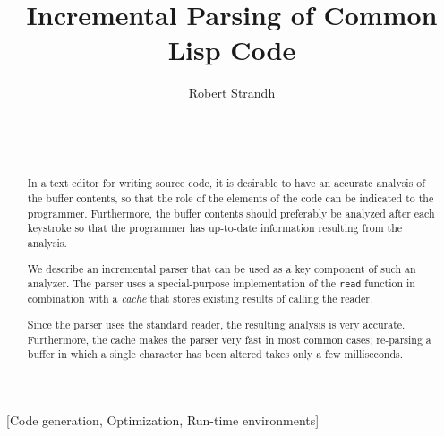 \documentclass{acm_proc_article-sp}
\def\inputtex#1{}
\begin{document}
\title{Incremental Parsing of Common Lisp Code}
\author{\alignauthor
Robert Strandh\\
\\
\\
\\
}


\maketitle

\begin{abstract}
In a text editor for writing \commonlisp{} \cite{ansi:common:lisp}
source code, it is desirable to have an accurate analysis of the
buffer contents, so that the role of the elements of the code can be
indicated to the programmer.  Furthermore, the buffer contents should
preferably be analyzed after each keystroke so that the programmer has
up-to-date information resulting from the analysis.

We describe an incremental parser that can be used as a key component
of such an analyzer.  The parser uses a special-purpose implementation
of the \commonlisp{} \texttt{read} function in combination with a
\emph{cache} that stores existing results of calling the reader.

Since the parser uses the standard \commonlisp{} reader, the resulting
analysis is very accurate.  Furthermore, the cache makes the parser
very fast in most common cases; re-parsing a buffer in which a single
character has been altered takes only a few milliseconds.
\end{abstract}

[Code generation, Optimization, Run-time environments]


\keywords{\commonlisp{}}

\inputtex{sec-introduction.tex}
\inputtex{sec-previous.tex}
\inputtex{sec-our-method.tex}
\inputtex{sec-performance.tex}
\inputtex{sec-conclusions.tex}
\inputtex{sec-acknowledgements.tex}



\end{document}
